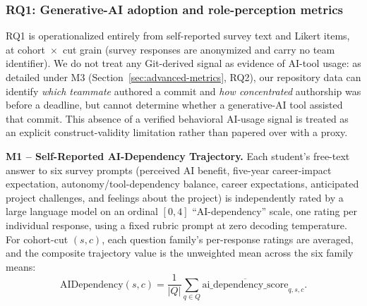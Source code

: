 \documentclass[conference]{IEEEtran}
\begin{document}

\subsubsection{RQ1: Generative-AI adoption and role-perception metrics}

RQ1 is operationalized entirely from self-reported survey text and Likert
items, at cohort~$\times$~cut grain (survey responses are anonymized and
carry no team identifier). We do not treat any Git-derived signal as
evidence of AI-tool usage: as detailed under M3 (Section~\ref{sec:advanced-metrics},
RQ2), our repository data can identify \emph{which teammate} authored a
commit and \emph{how concentrated} authorship was before a deadline, but
cannot determine whether a generative-AI tool assisted that commit. This
absence of a verified behavioral AI-usage signal is treated as an explicit
construct-validity limitation rather than papered over with a proxy.

\textbf{M1 -- Self-Reported AI-Dependency Trajectory.} Each student's
free-text answer to six survey prompts (perceived AI benefit, five-year
career-impact expectation, autonomy/tool-dependency balance, career
expectations, anticipated project challenges, and feelings about the
project) is independently rated by a large language model on an ordinal
$[0,4]$ ``AI-dependency'' scale, one rating per individual response, using a
fixed rubric prompt at zero decoding temperature. For cohort-cut $(s,c)$,
each question family's per-response ratings are averaged, and the composite
trajectory value is the unweighted mean across the six family means:
\[
\mathrm{AIDependency}(s,c) = \frac{1}{|Q|} \sum_{q \in Q} \overline{\mathrm{ai\_dependency\_score}}_{q,s,c}.
\]
\end{document}
